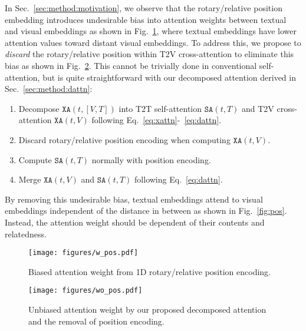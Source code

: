 In Sec.~\ref{sec:method:motivation}, we observe that the rotary/relative position embedding introduces undesirable bias into attention weights between textual and visual embeddings as shown in Fig.~\ref{fig:w-pos}, where textual embeddings have lower attention values toward distant visual embeddings.
To address this, we propose to \emph{discard} the rotary/relative position within T2V cross-attention to eliminate this bias as shown in Fig.~\ref{fig:wo-pos}.
This cannot be trivially done in conventional self-attention, but is quite straightforward with our decomposed attention derived in Sec.~\ref{sec:method:dattn}:
\begin{enumerate}
    \item Decompose $\texttt{XA}(t, [V,T])$ into T2T self-attention $\texttt{SA}(t, T)$ and T2V cross-attention $\texttt{XA}(t, V)$ following Eq.~\ref{eq:xattn}-~\ref{eq:dattn}.
    \item Discard rotary/relative position encoding when computing $\texttt{XA}(t, V)$.
    \item Compute $\texttt{SA}(t, T)$ normally with position encoding.
    \item Merge $\texttt{XA}(t, V)$ and $\texttt{SA}(t, T)$ following Eq.~\ref{eq:dattn}.
\end{enumerate}

By removing this undesirable bias, textual embeddings attend to visual embeddings independent of the distance in between as shown in Fig.~\ref{fig:pos}.
Instead, the attention weight should be dependent of their contents and relatedness.

\begin{figure*}[b]
\centering
\begin{subfigure}{.49\linewidth}
  \centering
  \texttt{[image: figures/w\_pos.pdf]}
  \caption{Biased attention weight from 1D rotary/relative position encoding.}\label{fig:w-pos}
\end{subfigure}
\hfill
\begin{subfigure}{.49\linewidth}
  \centering
  \texttt{[image: figures/wo\_pos.pdf]}
  \caption{Unbiased attention weight by our proposed decomposed attention and the removal of position encoding.}\label{fig:wo-pos}
\end{subfigure}
\caption{
1D rotary/relative position encoding introduces undesirable bias into the attention weights between textual and visual embeddings.
In our decomposed-attention framework, the 1D position encoding can be easily discarded to eliminate this undesired bias.
}\label{fig:pos}
\end{figure*}